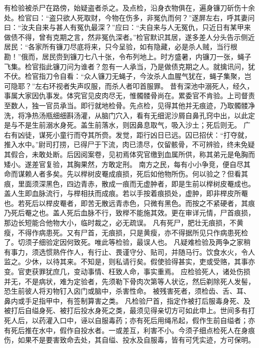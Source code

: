 \documentclass[12pt,UTF8]{ctexbook}
\begin{document}
有检验被杀尸在路傍，始疑盗者杀之。及点检，沿身衣物俱在，遍身镰刀斫伤十余处。检官曰：“盗只欲人死取财，今物在伤多，非冤仇而何？”遂屏左右，呼其妻问曰：“汝夫自来与甚人有冤仇最深？”应曰：“夫自来与人无冤仇，只近日有某甲来做债不得，曾有克期之言，然非冤仇深者。”检官默识其居，遂多差人分头告示侧近居民：“各家所有镰刀尽底将来，只今呈验，如有隐藏，必是杀人贼，当行根勘！”俄而，居民赍到镰刀七八十张，令布列地上。时方盛暑，内镰刀一张，蝇子飞集。检官指此镰刀问为谁者？忽有一人承当，乃是做债克期之人。就擒讯问，犹不伏。检官指刀令自看：“众人镰刀无蝇子，今汝杀人血腥气犹在，蝇子集聚，岂可隐耶？”左右环视者失声叹服，而杀人者叩首服罪。
昔有深池中溺死人，经久，事属大家因仇事发。体究官见皮肉尽无，惟髑髅骨尚在。累委官不肯验。上司督责至数人，独一官员承当。即行就地检骨。先点检，见得其他并无痕迹，乃取髑髅净洗，将净热汤瓶细细斟汤灌，从脑门穴入，看有无细泥沙屑自鼻孔窍中出，以此定是与不是生前溺水身死。盖生前落水，则因鼻息取气，吸入沙土；死后则无。
广右有凶徒，谋死小童行而夺其所赍。发觉，距行凶日已远。囚已招伏：“打夺就，推入水中。”尉司打捞，已得尸于下流，肉已溃尽，仅留骸骨，不可辨验，终未免疑其假合，未敢处断。后因阅案卷，见初焉体究官缴到血属所供，称其弟元是龟胸而矮小。遂差官复验，其胸果然，方敢定刑。
南方之民，每有小小争竞，便自尽其命而谋赖人者多矣。先以榉树皮罨成痕损，死后如他物所伤。何以验之？但看其痕，里面须深黑色，四边青赤，散成一痕而无虚肿者，即是生前以榉树皮罨成也。盖人生即血脉流行，与榉相扶而成痕。若以手按着痕损处，虚肿，即非榉皮所罨也。若死后以榉皮罨者，即苦无散远青赤色，只微有黑色。而按之不紧硬者，其痕乃死后罨之也。盖人死后血脉不行，致榉不能施其效。更在审详元情，尸首痕损，那边长短能合他物大小，临时裁之，必无疏误。
凡有死尸，肥壮无痕损，不黄瘦，不得作病患死。又有尸首，无痕损，只是黄瘦，亦不得据所见只作病患死检了。切须子细验定因何致死。唯此等检验，最误人也。
凡疑难检验及两争之家稍有事力，须选惯熟仵作人，有行止、畏谨守分、贴司，并随马行。饮食水火，令人监之。少休，以待其来。不知是，则私请行矣。假使验得甚实，吏或受赂，其事亦变。官吏获罪犹庶几，变动事情、枉致人命，事实重焉。
应检验死人，诸处伤损并无，不是病状，难为定验者，先须勒下骨肉次第等人状讫，然后剃除死人发髻，恐生前彼人将刃物钉入囟门或脑中，杀害性命。
被残害死者，须检齿、舌、耳、鼻内或手足指甲中，有签制算害之类。
凡检验尸首，指定作被打后服毒身死、及被打后自缢身死、被打后投水身死之类，最须见得亲切方可如此申上。世间多有打死人后，以药灌入口中，诬以自服毒药；亦有死后用绳吊起，假作生前自缢者；亦有死后推在水中，假作自投水者。一或差互，利害不小。今须子细点检死人在身痕伤，如果不是要害致命去处，其自缢、投水及自服毒，皆有可凭实迹，方可保明。
\end{document}
